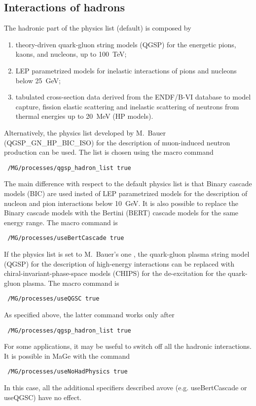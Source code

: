 \subsection{Interactions of hadrons}
The hadronic part of the physics list (default) is composed by 
\begin{enumerate}
\item theory-driven quark-gluon string models (QGSP) for the energetic pions, kaons, and nucleons, 
up to 100~TeV; 
\item LEP parametrized models for inelastic interactions of pions and nucleons below 25~GeV;
\item tabulated cross-section data derived from the 
ENDF/B-VI database to model capture, fission elastic scattering and 
inelastic scattering of neutrons from thermal energies up to 20~MeV (HP models). 
\end{enumerate}
%
Alternatively, the physics list developed by M.~Bauer (QGSP\_GN\_HP\_BIC\_ISO) for the description 
of muon-induced neutron production can be used. The list is chosen using the macro command
\begin{lstlisting}
 /MG/processes/qgsp_hadron_list true
\end{lstlisting}
The main difference with respect to the default physics list is that Binary cascade models (BIC) 
are used insted of LEP parametrized models for the 
description of nucleon and pion interactions below 10~GeV. It is also possible to replace the 
Binary cascade models with the Bertini (BERT) cascade models for the same energy range. 
The macro command is
\begin{lstlisting}
 /MG/processes/useBertCascade true
\end{lstlisting}
If the physics list is set to M.~Bauer's one , the quark-gluon plasma string 
model (QGSP) 
for the description of high-energy interactions can be replaced with chiral-invariant-phase-space 
models (CHIPS) for the de-excitation for the quark-gluon plasma. The macro command is 
\begin{lstlisting}
 /MG/processes/useQGSC true
\end{lstlisting}
As specified above, the latter command works only after
\begin{lstlisting}
 /MG/processes/qgsp_hadron_list true
\end{lstlisting}
%
For some applications, it may be useful to switch off all the hadronic interactions. It is 
possible in MaGe with the command 
\begin{lstlisting}
 /MG/processes/useNoHadPhysics true
\end{lstlisting}
In this case, all the additional specifiers described avove (e.g. useBertCascade or useQGSC) have no 
effect.
%
